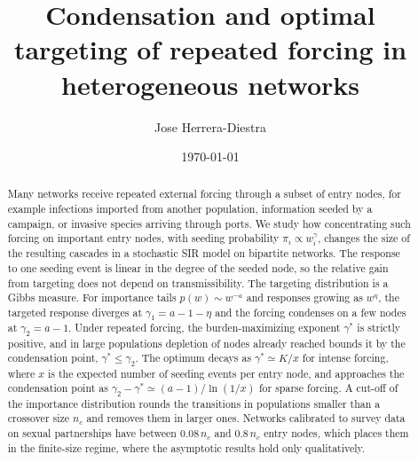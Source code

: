 \documentclass[pre,twocolumn,superscriptaddress,amsmath,amssymb,floatfix]{revtex4-2}
\begin{document}
\title{Condensation and optimal targeting of repeated forcing in heterogeneous networks}

\author{Jose Herrera-Diestra}

\date{\today}

\begin{abstract}
Many networks receive repeated external forcing through a subset of entry
nodes, for example infections imported from another population, information
seeded by a campaign, or invasive species arriving through ports. We study how
concentrating such forcing on important entry nodes, with seeding probability
$\pi_i\propto w_i^{\gamma}$, changes the size of the resulting cascades in a stochastic SIR
model on bipartite networks. The response to one seeding event is linear in the
degree of the seeded node, so the relative gain from targeting does not depend
on transmissibility. The targeting distribution is a Gibbs measure. For
importance tails $p(w)\sim w^{-a}$ and responses growing as $w^{\eta}$, the targeted
response diverges at $\gamma_1=a-1-\eta$ and the forcing condenses on a few nodes at
$\gamma_2=a-1$. Under repeated forcing, the burden-maximizing exponent $\gamma^*$ is
strictly positive, and in large populations depletion of nodes already reached
bounds it by the condensation point, $\gamma^*\le\gamma_2$. The optimum decays as $\gamma^*\simeq K/x$ for intense forcing, where $x$ is the
expected number of seeding events per entry node, and approaches the
condensation point as $\gamma_2-\gamma^*\simeq(a-1)/\ln(1/x)$ for sparse forcing. A cut-off of the
importance distribution rounds the transitions in populations smaller than a
crossover size $n_c$ and removes them in larger ones. Networks calibrated to
survey data on sexual partnerships have between $0.08\,n_c$ and $0.8\,n_c$ entry nodes,
which places them in the finite-size regime, where the asymptotic results hold
only qualitatively.
\end{abstract}

\maketitle

\end{document}

